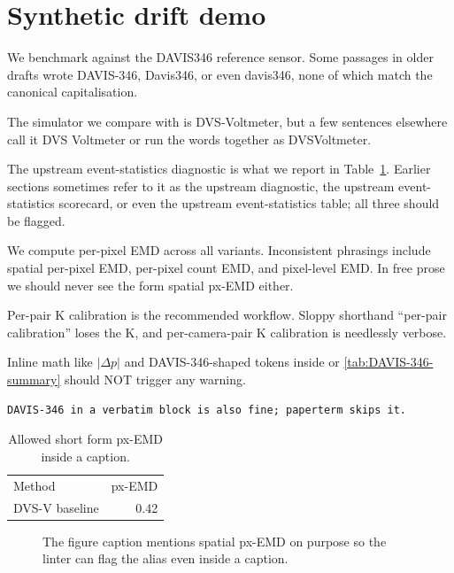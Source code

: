\section{Synthetic drift demo}
\label{sec:demo}


We benchmark against the DAVIS346 reference sensor.  Some passages
in older drafts wrote DAVIS-346, Davis346, or even davis346, none
of which match the canonical capitalisation.

The simulator we compare with is DVS-Voltmeter, but a few sentences
elsewhere call it DVS Voltmeter or run the words together as
DVSVoltmeter.

The upstream event-statistics diagnostic is what we report in
Table~\ref{tab:summary}.  Earlier sections sometimes refer to it as
the upstream diagnostic, the upstream event-statistics scorecard,
or even the upstream event-statistics table; all three should be
flagged.

We compute per-pixel EMD across all variants.  Inconsistent
phrasings include spatial per-pixel EMD, per-pixel count EMD, and
pixel-level EMD.  In free prose we should never see the form
spatial px-EMD either.

Per-pair K calibration is the recommended workflow.  Sloppy
shorthand ``per-pair calibration'' loses the K, and
per-camera-pair K calibration is needlessly verbose.

Inline math like $|\Delta p|$ and DAVIS-346-shaped tokens inside
\cite{DAVIS-346:2014, davis346-extended} or \ref{tab:DAVIS-346-summary}
should NOT trigger any warning.

\begin{verbatim}
DAVIS-346 in a verbatim block is also fine; paperterm skips it.
\end{verbatim}

\begin{table}[t]
  \centering
  \caption{Allowed short form px-EMD inside a caption.}
  \label{tab:summary}
  \begin{tabular}{lr}
    Method        & px-EMD \\
    DVS-V baseline & 0.42 \\
  \end{tabular}
\end{table}

\begin{figure}[t]
  \centering
  \caption{The figure caption mentions spatial px-EMD on purpose
    so the linter can flag the alias even inside a caption.}
\end{figure}
